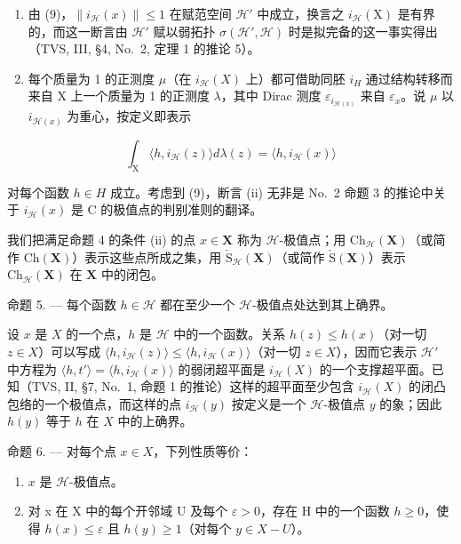 \begin{enumerate}
\def\labelenumi{(\roman{enumi})}
\item
  由 (9)，\(\| i_{\mathcal{H}}(x)\| \leqslant 1\) 在赋范空间 \(\mathcal{H}'\) 中成立，换言之 \(i_{\mathcal{H}}(\mathrm{X})\) 是有界的，而这一断言由 \(\mathcal{H}'\) 赋以弱拓扑 \(\sigma (\mathcal{H}',\mathcal{H})\) 时是拟完备的这一事实得出（TVS, III, §4, No.~2, 定理 1 的推论 5）。
\item
  每个质量为 1 的正测度 \(\mu\)（在 \(i_{\mathcal{H}}(X)\) 上）都可借助同胚 \(i_{H}\) 通过结构转移而来自 X 上一个质量为 1 的正测度 \(\lambda\)，其中 Dirac 测度 \(\varepsilon_{i_{\mathcal{H}(x)}}\) 来自 \(\varepsilon_{x}\)。说 \(\mu\) 以 \(i_{\mathcal{H}(x)}\) 为重心，按定义即表示
\end{enumerate}

\[
\int_ {\mathrm{X}} \langle h, i _ {\mathcal {H}} (z) \rangle d \lambda (z) = \langle h, i _ {\mathcal {H}} (x) \rangle
\]

对每个函数 \(h \in H\) 成立。考虑到 (9)，断言 (ii) 无非是 No.~2 命题 3 的推论中关于 \(i_{\mathcal{H}}(x)\) 是 C 的极值点的判别准则的翻译。

我们把满足命题 4 的条件 (ii) 的点 \(x \in \mathbf{X}\) 称为 \(\mathcal{H}\)-极值点；用 \(\mathrm{Ch}_{\mathcal{H}}(\mathbf{X})\)（或简作 \(\mathrm{Ch}(\mathbf{X})\)）表示这些点所成之集，用 \(\check{\mathrm{S}}_{\mathcal{H}}(\mathbf{X})\)（或简作 \(\check{\mathrm{S}}(\mathbf{X})\)）表示 \(\mathrm{Ch}_{\mathcal{H}}(\mathbf{X})\) 在 \(\mathbf{X}\) 中的闭包。

命题 5. --- 每个函数 \(h \in \mathcal{H}\) 都在至少一个 \(\mathcal{H}\)-极值点处达到其上确界。

设 \(x\) 是 \(X\) 的一个点，\(h\) 是 \(\mathcal{H}\) 中的一个函数。关系 \(h(z) \leqslant h(x)\)（对一切 \(z \in X\)）可以写成 \(\langle h, i_{\mathcal{H}}(z) \rangle \leqslant \langle h, i_{\mathcal{H}}(x) \rangle\)（对一切 \(z \in X\)），因而它表示 \(\mathcal{H}'\) 中方程为 \(\langle h, t' \rangle = \langle h, i_{\mathcal{H}}(x) \rangle\) 的弱闭超平面是 \(i_{\mathcal{H}}(X)\) 的一个支撑超平面。已知（TVS, II, §7, No.~1, 命题 1 的推论）这样的超平面至少包含 \(i_{\mathcal{H}}(X)\) 的闭凸包络的一个极值点，而这样的点 \(i_{\mathcal{H}}(y)\) 按定义是一个 \(\mathcal{H}\)-极值点 \(y\) 的象；因此 \(h(y)\) 等于 \(h\) 在 \(X\) 中的上确界。

命题 6. --- 对每个点 \(x \in X\)，下列性质等价：

\begin{enumerate}
\def\labelenumi{\alph{enumi})}
\item
  \(x\) 是 \(\mathcal{H}\)-极值点。
\item
  对 x 在 X 中的每个开邻域 U 及每个 \(\varepsilon > 0\)，存在 H 中的一个函数 \(h \geqslant 0\)，使得 \(h(x) \leqslant \varepsilon\) 且 \(h(y) \geqslant 1\)（对每个 \(y \in X - U\)）。
\end{enumerate}

